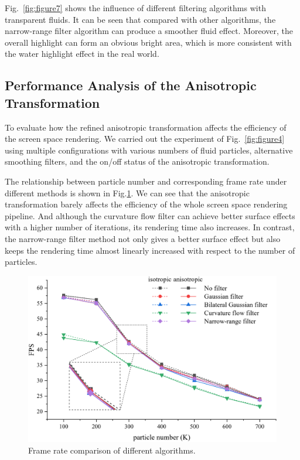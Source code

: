 \documentclass[times,twocolumn,final]{elsarticle}
\begin{document}
Fig.~\ref{fig:figure7} shows the influence of different filtering algorithms with transparent fluids. It can be seen that compared with other algorithms, the narrow-range filter algorithm can produce a smoother fluid effect. Moreover, the overall highlight can form an obvious bright area, which is more consistent with the water highlight effect in the real world.

\subsection{Performance Analysis of the Anisotropic Transformation}

To evaluate how the refined anisotropic transformation affects the efficiency of the screen space rendering. We carried out the experiment of Fig.~\ref{fig:figure4} using multiple configurations with various numbers of fluid particles, alternative smoothing filters, and the on/off status of the anisotropic transformation.

The relationship between particle number and corresponding frame rate under different methods is shown in Fig.\ref{fig:figure8}. We can see that the anisotropic transformation barely affects the efficiency of the whole screen space rendering pipeline. And although the curvature flow filter can achieve better surface effects with a higher number of iterations, its rendering time also increases. In contrast, the narrow-range filter method not only gives a better surface effect but also keeps the rendering time almost linearly increased with respect to the number of particles.

\begin{figure}[!t]
    \centering
    \includegraphics[width=\linewidth]{figs/FPS.png}
    \caption{Frame rate comparison of different algorithms.}
    \label{fig:figure8}
\end{figure}
\end{document}
